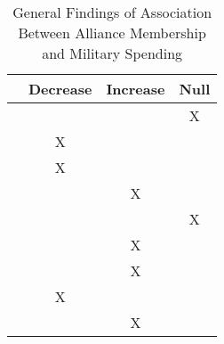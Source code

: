 \documentclass[12pt]{article}
\begin{document}
\begin{table}[hbt!]
\begin{tabular}{lccc}
     & Decrease & Increase & Null \\
\hline
\citet{MostSiverson1987} &  &  & X \\
\citet{Morrow1993} & X &  &  \\ 
\citet{Conybeare1994} & X & &  \\
\citet{Diehl1994} &  & X &  \\
\citet{Goldsmith2003} &  &  & X \\
\citet{MorganPalmer2006} &  & X & \\ 
\citet{QuirozFlores2011} &  & X &  \\ 
\citet{DigiuseppePoast2016} & X &  & \\ 
\citet{Horowitzetal2017} &  & X & \\ 
\hline
\end{tabular}
\caption{General Findings of Association Between Alliance Membership and Military Spending}
\end{table}





\singlespace


  
% 
\end{document}
